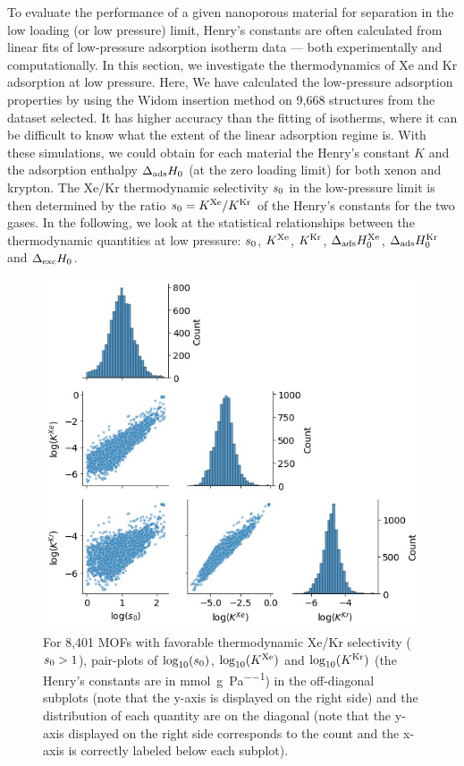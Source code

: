 \documentclass[main.tex]{subfiles}
\begin{document}
To evaluate the performance of a given nanoporous material for separation in the low loading (or low pressure) limit, Henry's constants are often calculated from linear fits of low-pressure adsorption isotherm data --- both experimentally and computationally. In this section, we investigate the thermodynamics of Xe and Kr adsorption at low pressure. Here, We have calculated the low-pressure adsorption properties by using the Widom insertion method\cite{Widom1963, frenkel2001widom} on 9,668 structures from the dataset selected. It has higher accuracy than the fitting of isotherms, where it can be difficult to know what the extent of the linear adsorption regime is. With these simulations, we could obtain for each material the Henry's constant $K$ and the adsorption enthalpy $\Delta_{\text{ads}}H_{\text{0}}$ (at the zero loading limit) for both xenon and krypton. The Xe/Kr thermodynamic selectivity $s_{\text{0}}$ in the low-pressure limit is then determined by the ratio $s_{\text{0}} = K^{\text{Xe}}/K^{\text{Kr}}$ of the Henry's constants for the two gases. In the following, we look at the statistical relationships between the thermodynamic quantities at low pressure: $s_{\text{0}}$, $K^{\text{Xe}}$, $K^{\text{Kr}}$, $\Delta_{\text{ads}}H_{\text{0}}^{\text{Xe}}$, $\Delta_{\text{ads}}H_{\text{0}}^{\text{Kr}}$ and $\Delta_{\text{exc}}H_{\text{0}}$.


\begin{figure}[t]
\centering
  \includegraphics[width=0.6\linewidth]{figures/2-thermo/Henry_0.jpg}
  \caption{For 8,401 MOFs with favorable thermodynamic Xe/Kr selectivity ($s_{\text{0}} > 1$), pair-plots of $\log_{\text{10}}(s_{\text{0}})$, $\log_{\text{10}}(K^{\text{Xe}})$ and $\log_{\text{10}}(K^{\text{Kr}})$ (the Henry's constants are in \si{\milli\mol\per\gram\per\pascal}) in the off-diagonal subplots (note that the y-axis is displayed on the right side) and the distribution of each quantity are on the diagonal (note that the y-axis displayed on the right side corresponds to the count and the x-axis is correctly labeled below each subplot).}
  \label{fgr:histo_K}
\end{figure}
\end{document}
